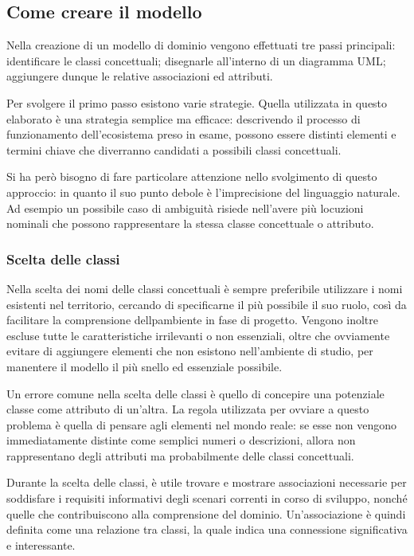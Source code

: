 \newpage

\subsection{Come creare il modello} %
\label{sub:come_creare_il_modello}

Nella creazione di un modello di dominio vengono effettuati tre passi principali: identificare le classi concettuali; disegnarle all’interno di un diagramma UML; aggiungere dunque le relative associazioni ed attributi.

Per svolgere il primo passo esistono varie strategie. Quella utilizzata in questo elaborato è una strategia semplice ma efficace: descrivendo il processo di funzionamento dell’ecosistema preso in esame, possono essere distinti elementi e termini chiave che diverranno candidati a possibili classi concettuali.

Si ha però bisogno di fare particolare attenzione nello svolgimento di questo approccio: in quanto il suo punto debole è l’imprecisione del linguaggio naturale. Ad esempio un possibile caso di ambiguità risiede nell’avere più locuzioni nominali che possono rappresentare la stessa classe concettuale o attributo.

\subsubsection{Scelta delle classi} %
\label{ssub:scelta_delle_classi}

Nella scelta dei nomi delle classi concettuali è sempre preferibile utilizzare i nomi esistenti nel territorio, cercando di specificarne il più possibile il suo ruolo, così da facilitare la comprensione dellpambiente in fase di progetto. Vengono inoltre escluse tutte le caratteristiche irrilevanti o non essenziali, oltre che ovviamente evitare di aggiungere elementi che non esistono nell’ambiente di studio, per manentere il modello il più snello ed essenziale possibile.

Un errore comune nella scelta delle classi è quello di concepire una potenziale classe come attributo di un’altra. La regola utilizzata per ovviare a questo problema è quella di pensare agli elementi nel mondo reale: se esse non vengono immediatamente distinte come semplici numeri o descrizioni, allora  non rappresentano degli attributi ma probabilmente delle classi concettuali.

Durante la scelta delle classi, è utile trovare e mostrare associazioni necessarie per soddisfare i requisiti informativi degli scenari correnti in corso di sviluppo, nonché quelle che contribuiscono alla comprensione del dominio.
Un'associazione è quindi definita come una relazione tra classi, la quale indica una connessione significativa e interessante.

